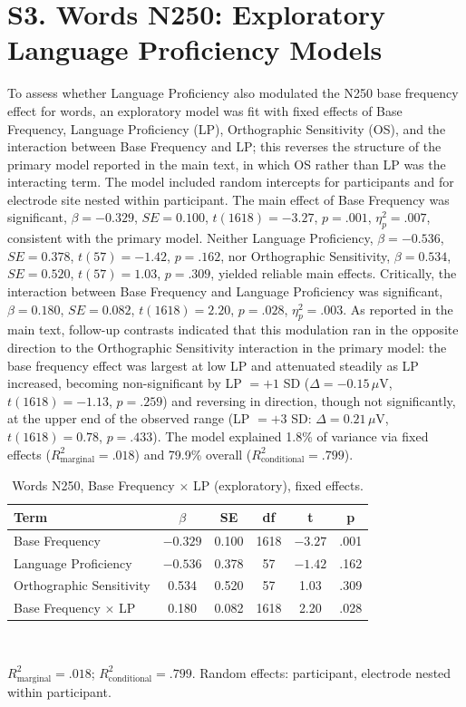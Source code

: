 \documentclass[11pt]{article}
\begin{document}
\section*{S3. Words N250: Exploratory Language Proficiency Models}

To assess whether Language Proficiency also modulated the N250 base frequency effect for words, an exploratory model was fit with fixed effects of Base Frequency, Language Proficiency (LP), Orthographic Sensitivity (OS), and the interaction between Base Frequency and LP; this reverses the structure of the primary model reported in the main text, in which OS rather than LP was the interacting term. The model included random intercepts for participants and for electrode site nested within participant. The main effect of Base Frequency was significant, $\beta = -0.329$, $SE = 0.100$, $t(1618) = -3.27$, $p = .001$, $\eta^2_p = .007$, consistent with the primary model. Neither Language Proficiency, $\beta = -0.536$, $SE = 0.378$, $t(57) = -1.42$, $p = .162$, nor Orthographic Sensitivity, $\beta = 0.534$, $SE = 0.520$, $t(57) = 1.03$, $p = .309$, yielded reliable main effects. Critically, the interaction between Base Frequency and Language Proficiency was significant, $\beta = 0.180$, $SE = 0.082$, $t(1618) = 2.20$, $p = .028$, $\eta^2_p = .003$. As reported in the main text, follow-up contrasts indicated that this modulation ran in the opposite direction to the Orthographic Sensitivity interaction in the primary model: the base frequency effect was largest at low LP and attenuated steadily as LP increased, becoming non-significant by LP $= +1$ SD ($\Delta = -0.15\,\mu$V, $t(1618) = -1.13$, $p = .259$) and reversing in direction, though not significantly, at the upper end of the observed range (LP $= +3$ SD: $\Delta = 0.21\,\mu$V, $t(1618) = 0.78$, $p = .433$). The model explained 1.8\% of variance via fixed effects ($R^2_{\mathrm{marginal}} = .018$) and 79.9\% overall ($R^2_{\mathrm{conditional}} = .799$).

\begin{table}[h!]
	\centering
	\small
	\caption{Words N250, Base Frequency $\times$ LP (exploratory), fixed effects.}
	\label{tab:s3a}
	\begin{tabular}{lccccc}
		\toprule
		\textbf{Term} & $\beta$ & \textbf{SE} & \textbf{df} & \textbf{t} & \textbf{p} \\
		\midrule
		Base Frequency & $-0.329$ & 0.100 & 1618 & $-3.27$ & .001 \\
		Language Proficiency & $-0.536$ & 0.378 & 57 & $-1.42$ & .162 \\
		Orthographic Sensitivity & 0.534 & 0.520 & 57 & 1.03 & .309 \\
		Base Frequency $\times$ LP & 0.180 & 0.082 & 1618 & 2.20 & .028 \\
		\bottomrule
	\end{tabular}
	\\[4pt]
	\raggedright \footnotesize $R^2_{\mathrm{marginal}} = .018$; $R^2_{\mathrm{conditional}} = .799$. Random effects: participant, electrode nested within participant.
\end{table}
\end{document}
